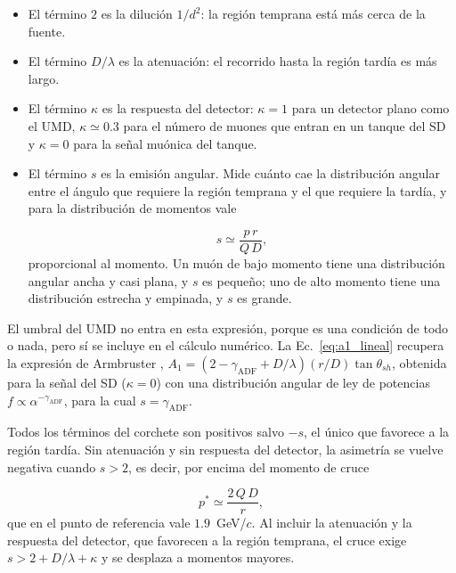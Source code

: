\begin{itemize}
	\item El término $2$ es la dilución $1/d^2$: la región temprana está más cerca de la fuente.
	
	\item El término $D/\lambda$ es la atenuación: el recorrido hasta la región tardía es más largo.
	
	\item El término $\kappa$ es la respuesta del detector: $\kappa=1$ para un detector plano como el UMD, $\kappa\simeq0.3$ para el número de muones que entran en un tanque del SD y $\kappa=0$ para la señal muónica del tanque.
	
	\item El término $s$ es la emisión angular. Mide cuánto cae la distribución angular entre el ángulo que requiere la región temprana y el que requiere la tardía, y para la distribución de momentos vale
	
	\begin{equation}
		s \simeq \frac{p\,r}{Q\,D},
		\label{eq:pendiente_s}
	\end{equation}
	proporcional al momento. Un muón de bajo momento tiene una distribución angular ancha y casi plana, y $s$ es pequeño; uno de alto momento tiene una distribución estrecha y empinada, y $s$ es grande.
\end{itemize}

El umbral del UMD no entra en esta expresión, porque es una condición de todo o nada, pero sí se incluye en el cálculo numérico. La Ec.~\ref{eq:a1_lineal} recupera la expresión de Armbruster \cite{Armbruster2018}, $A_1 = (2-\gamma_{\mathrm{ADF}}+D/\lambda)(r/D)\tan\theta_{sh}$, obtenida para la señal del SD ($\kappa=0$) con una distribución angular de ley de potencias $f\propto\alpha^{-\gamma_{\mathrm{ADF}}}$, para la cual $s=\gamma_{\mathrm{ADF}}$.

Todos los términos del corchete son positivos salvo $-s$, el único que favorece a la región tardía. Sin atenuación y sin respuesta del detector, la asimetría se vuelve negativa cuando $s>2$, es decir, por encima del momento de cruce

\begin{equation}
	p^* \simeq \frac{2\,Q\,D}{r},
	\label{eq:p_cruce}
\end{equation}
%
que en el punto de referencia vale $1.9$~GeV/$c$. Al incluir la atenuación y la respuesta del detector, que favorecen a la región temprana, el cruce exige $s>2+D/\lambda+\kappa$ y se desplaza a momentos mayores.

